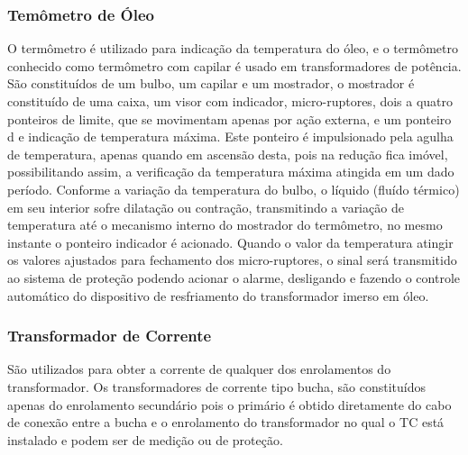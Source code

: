\documentclass[a5paper,english,spanish,brazil]{ufsc-thesis}
\begin{document}
\subsubsection{Temômetro de Óleo}
O termômetro é utilizado para indicação da temperatura do óleo, e o termômetro conhecido como termômetro com capilar é usado em transformadores de potência. São constituídos de um bulbo, um capilar e um mostrador, o mostrador é constituído de uma caixa, um visor com indicador, micro-ruptores, dois a quatro ponteiros de limite, que se movimentam apenas por ação externa, e um ponteiro d e indicação de temperatura máxima. Este ponteiro é impulsionado pela agulha de temperatura, apenas quando em ascensão desta, pois na redução fica imóvel, possibilitando assim, a verificação da temperatura máxima atingida em um dado período. Conforme a variação da temperatura do bulbo, o líquido (fluído térmico) em seu interior sofre dilatação ou contração, transmitindo a variação de temperatura até o mecanismo interno do mostrador do termômetro, no mesmo instante o ponteiro indicador é acionado. Quando o valor da temperatura atingir os valores ajustados para fechamento dos micro-ruptores, o sinal será transmitido ao sistema de proteção podendo acionar o alarme, desligando e fazendo o controle automático do dispositivo de resfriamento do transformador imerso em óleo.

\subsubsection{Transformador de Corrente}
São utilizados para obter a corrente de qualquer dos enrolamentos do transformador. Os transformadores de corrente tipo bucha, são constituídos apenas do enrolamento secundário pois o primário é obtido diretamente do cabo de conexão entre a bucha e o enrolamento do transformador no qual o TC está instalado e podem ser de medição ou de proteção.
\end{document}
